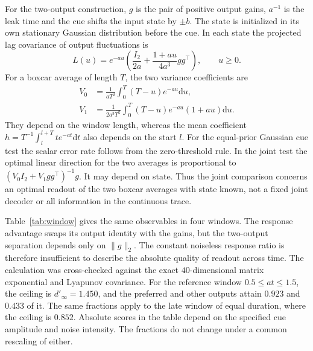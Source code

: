 \documentclass[aps,10pt,onecolumn,superscriptaddress,nofootinbib,
  longbibliography,amsmath,amssymb,floatfix]{revtex4-2}
\newcommand{\dd}{\mathrm{d}}
\begin{document}
For the two-output construction, \(g\) is the pair of positive output
gains, \(a^{-1}\) is the leak time and the cue shifts the input state by
\(\pm b\). The state is initialized in its own stationary Gaussian
distribution before the cue. In each state the projected lag covariance
of output fluctuations is
\begin{equation}
 L(u)=e^{-au}\left(\frac{I_2}{2a}
             +\frac{1+au}{4a^3}gg^\top\right), \qquad u\ge0 .
\end{equation}
For a boxcar average of length \(T\), the two variance coefficients are
\begin{align}
 V_0 &= \frac{1}{aT^2}\int_0^T(T-u)e^{-au}\dd u,\\
 V_1 &= \frac{1}{2a^3T^2}\int_0^T(T-u)e^{-au}(1+au)\dd u .
\end{align}
They depend on the window length, whereas the mean coefficient
\(h=T^{-1}\int_l^{l+T} t e^{-at}\dd t\) also depends on the start \(l\).
For the equal-prior Gaussian cue test the scalar error rate follows
from the zero-threshold rule. In the joint test the optimal linear
direction for the two averages is proportional to
\((V_0 I_2+V_1 gg^\top)^{-1}g\). It may depend on state. Thus the joint
comparison concerns an optimal readout of the two boxcar averages
with state known, not a fixed joint decoder or all information in
the continuous trace.

Table~\ref{tab:window} gives the same observables in four windows.
The response advantage swaps its output identity with the gains,
but the two-output separation depends only on \(\|g\|_2\).
The constant noiseless response ratio is therefore insufficient
to describe the absolute quality of readout across time. The
calculation was cross-checked against the exact \(40\)-dimensional
matrix exponential and Lyapunov covariance.
For the reference window \(0.5\le at\le1.5\), the ceiling is
\(d'_\infty=1.450\), and the preferred and other outputs attain
\(0.923\) and \(0.433\) of it. The same fractions apply to the
late window of equal duration, where the ceiling is \(0.852\).
Absolute scores in the table depend on the specified cue amplitude
and noise intensity. The fractions do not change under a common
rescaling of either.
\end{document}
